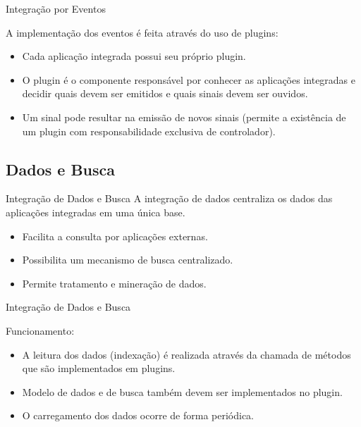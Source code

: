 \documentclass{beamer}
\begin{document}
\begin{frame}{Integração por Eventos}

  A implementação dos eventos é feita através do uso de plugins:
  \begin{itemize}
  \item {
    Cada aplicação integrada possui seu próprio plugin.
  }
  \item{
    O plugin é o componente responsável por conhecer as aplicações integradas e decidir quais devem ser emitidos e quais sinais devem ser ouvidos.
  }
  \item{
    Um sinal pode resultar na emissão de novos sinais (permite a existência de um plugin com responsabilidade exclusiva de controlador).
  }
  \end{itemize}
\end{frame}

\subsection{Dados e Busca}

\begin{frame}{Integração de Dados e Busca}
  A integração de dados centraliza os dados das aplicações integradas em uma única base.
  \hfill \break

  \begin{itemize}
  \item {
    Facilita a consulta por aplicações externas.
  }
  \item {
    Possibilita um mecanismo de busca centralizado.
  }
  \item {
    Permite tratamento e mineração de dados.
  }
  \end{itemize}
\end{frame}

\begin{frame}{Integração de Dados e Busca}
  
  Funcionamento:

  \begin{itemize}
  \item {
    A leitura dos dados (indexação) é realizada através da chamada de métodos que são implementados em plugins.
  }
  
  \item{
    Modelo de dados e de busca também devem ser implementados no plugin.
  }
  
  \item {
    O carregamento dos dados ocorre de forma periódica.
  }
  \end{itemize}
\end{frame}
\end{document}
